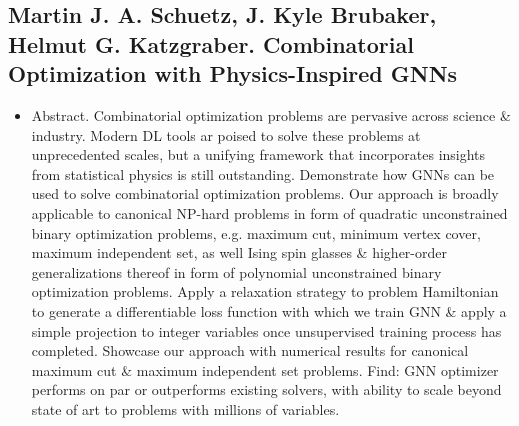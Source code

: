 \documentclass{article}
\begin{document}

\subsection{{\sc Martin J. A. Schuetz, J. Kyle Brubaker, Helmut G. Katzgraber}. Combinatorial Optimization with Physics-Inspired GNNs}

\begin{itemize}
    \item {\sf Abstract.} Combinatorial optimization problems are pervasive across science \& industry. Modern DL tools ar poised to solve these problems at unprecedented scales, but a unifying framework that incorporates insights from statistical physics is still outstanding. Demonstrate how GNNs can be used to solve combinatorial optimization problems. Our approach is broadly applicable to canonical NP-hard problems in form of quadratic unconstrained binary optimization problems, e.g. maximum cut, minimum vertex cover, maximum independent set, as well Ising spin glasses \& higher-order generalizations thereof in form of polynomial unconstrained binary optimization problems. Apply a relaxation strategy to problem Hamiltonian to generate a differentiable loss function with which we train GNN \& apply a simple projection to integer variables once unsupervised training process has completed. Showcase our approach with numerical results for canonical maximum cut \& maximum independent set problems. Find: GNN optimizer performs on par or outperforms existing solvers, with ability to scale beyond state of art to problems with millions of variables.


\end{itemize}
\end{document}
